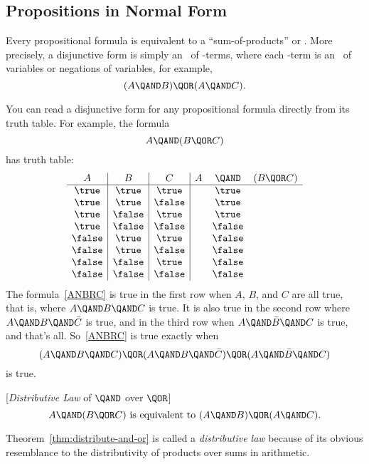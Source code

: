 \subsection{Propositions in Normal Form}\label{normal_form_sec}
Every propositional formula is equivalent to a ``sum-of-products''
or .  More precisely, a disjunctive form is
simply an \QOR\ of \QAND-terms, where each \QAND-term is an \QAND\ of
variables or negations of variables, for example, 
\begin{equation}\label{ANBOANC}
(A \QAND B) \QOR (A \QAND C).
\end{equation}

You can read a disjunctive form for any propositional formula directly
from its truth table.  For example, the formula
\begin{equation}\label{ANBRC}
A \QAND (B \QOR C)
\end{equation}
has truth table:
\[\begin{array}{c|c|c|ccc}
A      & B      & C       & A & \QAND & (B \QOR C)\label{ANBRCTT}\\
\hline \true  & \true  & \true   &   &  \true\\
\true  & \true  & \false  &   &  \true\\
\true  & \false & \true   &   &  \true\\
\true  & \false & \false  &   &  \false\\
\false & \true  & \true   &   &  \false\\
\false & \true  & \false  &   &  \false\\
\false & \false & \true   &   &  \false\\
\false & \false & \false  &   &  \false
\end{array}\]
The formula~\eqref{ANBRC} is true in the first row when $A$, $B$, and
$C$ are all true, that is, where $A \QAND B \QAND C$ is true.  It is
also true in the second row where $A \QAND B \QAND \bar{C}$ is true,
and in the third row when $A \QAND \bar{B} \QAND C$ is true, and
that's all.  So~\eqref{ANBRC} is true exactly when
\begin{equation}\label{ABCDNF}
(A \QAND B \QAND C) \QOR (A \QAND B \QAND \bar{C}) \QOR
  (A \QAND \bar{B} \QAND C)
\end{equation}
is true.
\begin{theorem}\label{thm:distribute-and-or}[\emph{Distributive Law} of $\QAND$ over $\QOR$]%
\[
A \QAND (B \QOR C)\text{ is equivalent to } (A \QAND B) \QOR (A \QAND C).
\]
\end{theorem}
Theorem~\ref{thm:distribute-and-or} is called a \emph{distributive law}
because of its obvious resemblance to the distributivity of products
over sums in arithmetic.

